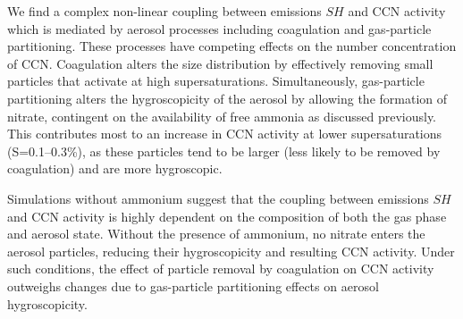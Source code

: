 We find a complex non-linear coupling between emissions $SH$ and CCN activity which is mediated by aerosol processes including coagulation and gas-particle partitioning. These processes have competing effects on the number concentration of CCN. Coagulation alters the size distribution by effectively removing small particles that activate at high supersaturations. Simultaneously, gas-particle partitioning alters the hygroscopicity of the aerosol by allowing the formation of nitrate, contingent on the availability of free ammonia as discussed previously. This contributes most to an increase in CCN activity at lower supersaturations (S=0.1--0.3\%), as these particles tend to be larger (less likely to be removed by coagulation) and are more hygroscopic. 

Simulations without ammonium suggest that the coupling between emissions $SH$ and CCN activity is highly dependent on the composition of both the gas phase and aerosol state. Without the presence of ammonium, no nitrate enters the aerosol particles, reducing their hygroscopicity and resulting CCN activity. Under such conditions, the effect of particle removal by coagulation on CCN activity outweighs changes due to gas-particle partitioning effects on aerosol hygroscopicity. 





